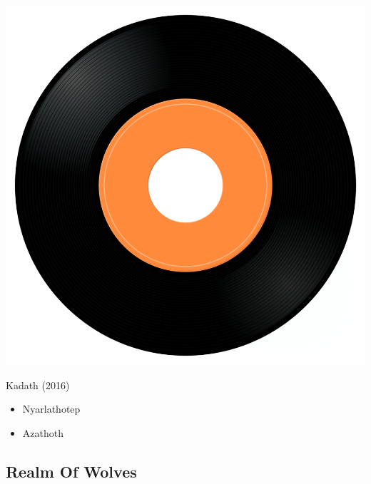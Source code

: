 \begin{minipage}[t]{0.25\textwidth}
\captionsetup{type=figure}
\includegraphics[width=\textwidth]{Images/cover.png}
\caption*{Kadath (2016)}
\end{minipage}
\begin{minipage}[t]{0.25\textwidth}\vspace{0pt}
\begin{itemize}[nosep,leftmargin=1em,labelwidth=*,align=left]
	\setlength{\itemsep}{0pt}
	\item Nyarlathotep 
	\item Azathoth 
\end{itemize}
\end{minipage}

\subsection{Realm Of Wolves}


